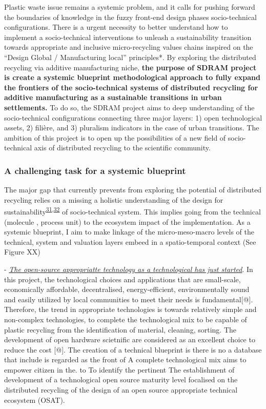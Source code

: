 \documentclass[
  11pt,
  a4paperpaper,
  onecolumn]{article}
\begin{document}
Plastic waste issue remains a systemic problem, and it calls for pushing
forward the boundaries of knowledge in the fuzzy front-end design phases
socio-technical configurations. There is a urgent necessity to better
understand how to implement a socio-technical interventions to unleash a
sustainability transition towards appropriate and inclusive
micro-recycling values chains inspired on the ``Design Global /
Manufacturing local'' principles*. By exploring the distributed
recycling via additive manufacturing niche, \textbf{the purpose of SDRAM
project is create a systemic blueprint methodological approach to fully
expand the frontiers of the socio-technical systems of distributed
recycling for additive manufacturing as a sustainable transitions in
urban settlements.} To do so, the SDRAM project aims to deep
understanding of the socio-technical configurations connecting three
major layers: 1) open technological assets, 2) filière, and 3) pluralism
indicators in the case of urban transitions. The ambition of this
project is to open up the possibilities of a new field of
socio-technical axis of distributed recycling to the scientific
community.

\hypertarget{a-challenging-task-for-a-systemic-blueprint}{%
\subsubsection{A challenging task for a systemic
blueprint}\label{a-challenging-task-for-a-systemic-blueprint}}

The major gap that currently prevents from exploring the potential of
distributed recycling relies on a missing a holistic understanding of
the design for
sustainability\textsuperscript{\protect\hyperlink{ref-Ceschin2016}{31},\protect\hyperlink{ref-SousaRocha2019}{32}}
of socio-technical system. This implies going from the technical
(molecule , process unit) to the ecosystem impact of the implementation.
As a systemic blueprint, I aim to make linkage of the micro-meso-macro
levels of the technical, system and valuation layers embeed in a
spatio-temporal context (See Figure XX)

-
\textit{\underline{The open-source appropriatte technology as a technological has just started}}.
In this project, the technological choices and applications that are
small-scale, economically affordable, decentralised, energy-efficient,
environmentally sound and easily utilized by local communities to meet
their needs is fundamental{[}@{]}. Therefore, the trend in appropriate
technologies is towards relatively simple and non-complex technologies,
to complete the technological mix to be capable of plastic recycling
from the identification of material, cleaning, sorting. The development
of open hardware scietnific are considered as an excellent choice to
reduce the cost {[}@{]}. The creation of a technical blueprint is there
is no a database that include is regarded as the front of A complete
technological mix aims to empower citizen in the. to To identify the
pertinent The establishment of development of a technological open
source maturity level focalised on the distributed recycling of the
design of an open source appropriate technical ecosystem (OSAT).
\end{document}
